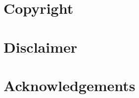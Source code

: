 \documentclass[../main/main.tex]{subfiles}
\begin{document}
\section*{Copyright}
\section*{Disclaimer}
\section*{Acknowledgements}
\end{document}
